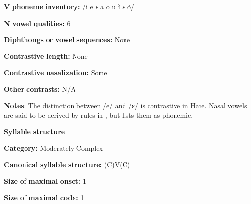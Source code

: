 \documentclass[output=paper]{langsci/langscibook}
\begin{document}
\begin{styleBody}
\textbf{V} \textbf{phoneme} \textbf{inventory:} /i e ɛ a o u ĩ ɛ õ/
\end{styleBody}

\begin{styleBody}
\textbf{N} \textbf{vowel} \textbf{qualities:} 6
\end{styleBody}

\begin{styleBody}
\textbf{Diphthongs} \textbf{or} \textbf{vowel} \textbf{sequences:} None
\end{styleBody}

\begin{styleBody}
\textbf{Contrastive} \textbf{length:} None
\end{styleBody}

\begin{styleBody}
\textbf{Contrastive} \textbf{nasalization:} Some
\end{styleBody}

\begin{styleBody}
\textbf{Other} \textbf{contrasts:} N/A
\end{styleBody}

\begin{styleBody}
\textbf{Notes:} The distinction between /e/ and /ɛ/ is contrastive in Hare. Nasal vowels are said to be derived by rules in \citet{Rice1989}, but \citet{Rice2005} lists them as phonemic.
\end{styleBody}

\begin{styleBody}
\textbf{Syllable} \textbf{structure}
\end{styleBody}

\begin{styleBody}
\textbf{Category:} Moderately Complex
\end{styleBody}

\begin{styleBody}
\textbf{Canonical} \textbf{syllable} \textbf{structure:} (C)V(C) \citep[143-53]{Rice1989}
\end{styleBody}

\begin{styleBody}
\textbf{Size} \textbf{of} \textbf{maximal} \textbf{onset:} 1
\end{styleBody}

\begin{styleBody}
\textbf{Size} \textbf{of} \textbf{maximal} \textbf{coda:} 1
\end{styleBody}
\end{document}
